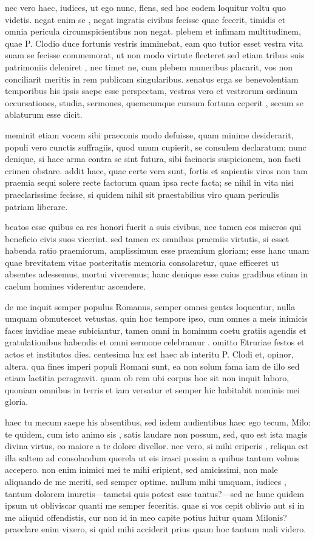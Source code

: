  nec vero haec, iudices, ut ego nunc, flens, sed hoc eodem loquitur voltu quo videtis. negat enim se , negat ingratis civibus fecisse quae fecerit, timidis et omnia pericula circumspicientibus non negat. plebem et infimam multitudinem, quae P. Clodio duce fortunis vestris imminebat, eam quo tutior esset vestra vita suam se fecisse commemorat, ut non modo virtute flecteret sed etiam tribus suis patrimoniis deleniret , nec timet ne, cum plebem muneribus placarit, vos non conciliarit meritis in rem publicam singularibus. senatus erga se benevolentiam temporibus his ipsis saepe esse perspectam, vestras vero et vestrorum ordinum occursationes, studia, sermones, quemcumque cursum fortuna ceperit , secum se ablaturum esse dicit.

 meminit etiam vocem sibi praeconis modo defuisse, quam minime desiderarit, populi vero cunctis suffragiis, quod unum cupierit, se consulem declaratum; nunc denique, si haec arma contra se sint futura, sibi facinoris suspicionem, non facti crimen obstare. addit haec, quae certe vera sunt, fortis et sapientis viros non tam praemia sequi solere recte factorum quam ipsa recte facta; se nihil in vita nisi praeclarissime fecisse, si quidem nihil sit praestabilius viro quam periculis patriam liberare.

 beatos esse quibus ea res honori fuerit a suis civibus, nec tamen eos miseros qui beneficio civis suos vicerint. sed tamen ex omnibus praemiis virtutis, si esset habenda ratio praemiorum, amplissimum esse praemium gloriam; esse hanc unam quae brevitatem vitae posteritatis memoria consolaretur, quae efficeret ut absentes adessemus, mortui viveremus; hanc denique esse cuius gradibus etiam in caelum homines viderentur ascendere.

 de me inquit semper populus Romanus, semper omnes gentes loquentur, nulla umquam obmutescet vetustas. quin hoc tempore ipso, cum omnes a meis inimicis faces invidiae meae subiciantur, tamen omni in hominum coetu gratiis agendis et gratulationibus habendis et omni sermone celebramur . omitto Etruriae festos et actos et institutos dies. centesima lux est haec ab interitu P. Clodi et, opinor, altera. qua fines imperi populi Romani sunt, ea non solum fama iam de illo sed etiam laetitia peragravit. quam ob rem ubi corpus hoc sit non inquit laboro, quoniam omnibus in terris et iam versatur et semper hic habitabit nominis mei gloria.

 haec tu mecum saepe his absentibus, sed isdem audientibus haec ego tecum, Milo: te quidem, cum isto animo sis , satis laudare non possum, sed, quo est ista magis divina virtus, eo maiore a te dolore divellor. nec vero, si mihi eriperis , reliqua est illa saltem ad consolandum querela ut eis irasci possim a quibus tantum volnus accepero. non enim inimici mei te mihi eripient, sed amicissimi, non male aliquando de me meriti, sed semper optime. nullum mihi umquam, iudices , tantum dolorem inuretis—tametsi quis potest esse tantus?—sed ne hunc quidem ipsum ut obliviscar quanti me semper feceritis. quae si vos cepit oblivio aut si in me aliquid offendistis, cur non id in meo capite potius luitur quam Milonis? praeclare enim vixero, si quid mihi acciderit prius quam hoc tantum mali videro.

